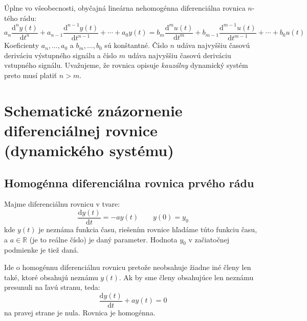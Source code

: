 \documentclass[a4paper, 10pt, ]{article}
\begin{document}
Úplne vo všeobecnosti, obyčajná lineárna nehomogénna diferenciálna rovnica $n$-tého rádu:
\begin{equation}
    a_n \frac{\text{d}^n y(t)}{\text{d}t^n} 
    + a_{n-1} \frac{\text{d}^{n-1} y(t)}{\text{d}t^{n-1}}
    +
    \cdots
    +
    a_0 y(t)
    =
    b_m \frac{\text{d}^m u(t)}{\text{d}t^m} 
    + b_{m-1} \frac{\text{d}^{m-1} u(t)}{\text{d}t^{m-1}}
    +
    \cdots
    +
    b_0 u(t)
\end{equation}
Koeficienty $a_n, \ldots, a_0$ a $b_m, \ldots, b_0$ sú konštantné. Číslo $n$ udáva najvyššiu časovú deriváciu výstupného signálu a číslo $m$ udáva najvyššiu časovú deriváciu vstupného signálu. Uvažujeme, že rovnica opisuje \emph{kauzálny} dynamický systém preto musí platiť $n>m$.























\section[Schematické znázornenie diferenciálnej rovnice]{Schematické znázornenie diferenciálnej rovnice\\(dynamického systému)}

\subsection{Homogénna diferenciálna rovnica prvého rádu}


Majme diferenciálnu rovnicu v tvare:
\begin{equation} \label{hodrpr01}
    \frac{\text{d}y(t)}{\text{d}t} = - a y(t) \qquad y(0)=y_0
\end{equation}
kde $y(t)$ je neznáma funkcia času, riešením rovnice hľadáme túto funkciu času, a $a\in\mathbb{R}$ (je to reálne číslo) je daný parameter. Hodnota $y_0$ v začiatočnej podmienke je tiež daná.

Ide o homogénnu diferenciálnu rovnicu pretože neobsahuje žiadne iné členy len také, ktoré obsahujú neznámu $y(t)$. Ak by sme členy obsahujúce len neznámu presunuli na ľavú stranu, teda:
\begin{equation}
    \frac{\text{d}y(t)}{\text{d}t} + a y(t) = 0
\end{equation}
na pravej strane je nula. Rovnica je homogénna.
\end{document}

